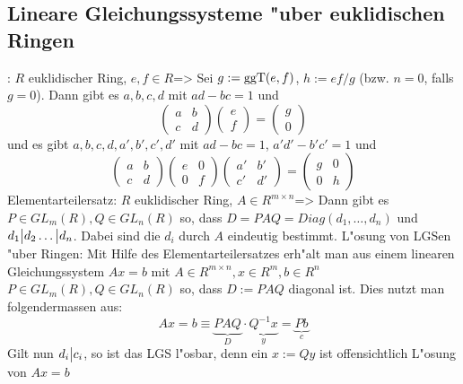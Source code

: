 \subsection{Lineare Gleichungssysteme "uber euklidischen Ringen}
\theorem:
  $R$ euklidischer Ring, $e,f\in R$=>{
  Sei $g:=\operatorname{ggT}(e,f)$, $h:=ef/g$ (bzw. $n=0$, falls $g=0$).
  Dann gibt es $a,b,c,d$ mit $ad-bc=1$ und
  \[\begin{pmatrix}
      a & b \\ c & d
      \end{pmatrix}
    \begin{pmatrix}
      e \\ f
      \end{pmatrix}=
    \begin{pmatrix}
      g \\ 0
      \end{pmatrix}
    \]
  und es gibt $a,b,c,d,a',b',c',d'$ mit $ad-bc=1$, $a'd'-b'c'=1$ und
  \[\begin{pmatrix}
      a & b \\ c & d
      \end{pmatrix}
    \begin{pmatrix}
      e & 0 \\ 0 & f
      \end{pmatrix}
    \begin{pmatrix}
      a' & b' \\ c' & d'
      \end{pmatrix}=
    \begin{pmatrix}
      g & 0 \\ 0 & h
      \end{pmatrix}
    \]
  }
\theorem Elementarteilersatz:
  $R$ euklidischer Ring, $A\in R^{m\times n}$=>{ 
  Dann gibt es 
  $P\in GL_m(R),Q\in GL_n(R)$ so, dass $D=PAQ=Diag(d_1,\ldots,d_n)$
  und $d_1\big| d_2\ldots \big| d_n$. Dabei sind die $d_i$ 
  durch $A$ eindeutig bestimmt.
  }
\remark L"osung von LGSen "uber Ringen:{
  Mit Hilfe des Elementarteilersatzes erh"alt man aus einem linearen
  Gleichungssystem $Ax=b$ mit $A\in R^{m\times n},x\in R^m,b\in R^n$
  $P\in GL_m(R),Q\in GL_n(R)$ so, dass $D:=PAQ$ diagonal ist.
  Dies nutzt man folgendermassen aus:
  \[Ax=b\equiv \underbrace{PAQ}_D \cdot \underbrace{Q^{-1}x}_y=\underbrace{Pb}_c
    \]
  Gilt nun $d_i\big| c_i$, so ist das LGS l"osbar, denn ein $x:=Qy$ ist
  offensichtlich L"osung von $Ax=b$
  }
